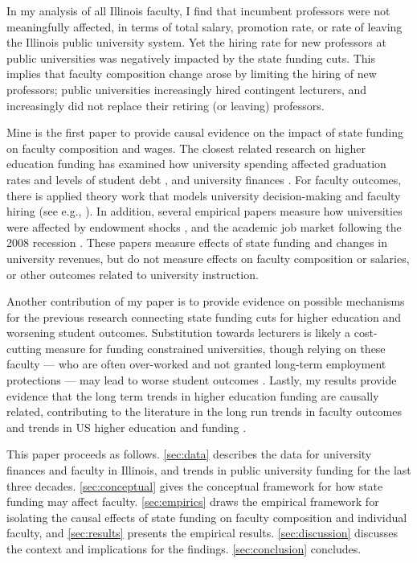 In my analysis of all Illinois faculty, I find that incumbent professors were not meaningfully affected, in terms of total salary, promotion rate, or rate of leaving the Illinois public university system.
Yet the hiring rate for new professors at public universities was negatively impacted by the state funding cuts.
This implies that faculty composition change arose by limiting the hiring of new professors; public universities increasingly hired contingent lecturers, and increasingly did not replace their retiring (or leaving) professors.

Mine is the first paper to provide causal evidence on the impact of state funding on faculty composition and wages.
The closest related research on higher education funding has examined how university spending affected graduation rates and levels of student debt \citep{NBERw23736,NBERw27885}, and university finances \citep{miller2022making,bound2019public,brown2014endowment}.
For faculty outcomes, there is applied theory work that models university decision-making and faculty hiring (see e.g., \citealt{abe2015implications,johnson2009jep,NBERc13879}).
In addition, several empirical papers measure how universities were affected by endowment shocks \citep{brown2014endowment}, and the academic job market following the 2008 recession \citep{turner2014impact}.
These papers measure effects of state funding and changes in university revenues, but do not measure effects on faculty composition or salaries, or other outcomes related to university instruction.

Another contribution of my paper is to provide evidence on possible  mechanisms for the previous research connecting state funding cuts for higher education and worsening student outcomes.
Substitution towards lecturers is likely a cost-cutting measure for funding constrained universities, though relying on these faculty --- who are often over-worked and not granted long-term employment protections --- may lead to worse student outcomes \citep{ehrenberg2005tenured,zhu2021limited,jaeger2011examining}.
Lastly, my results provide evidence that the long term trends in higher education funding are causally related, contributing to the literature in the long run trends in faculty outcomes \citep{ehrenberg2003studying} and trends in US higher education and funding \citep{hoxby2009changing}.

This paper proceeds as follows.
\autoref{sec:data} describes the data for university finances and faculty in Illinois, and trends in public university funding for the last three decades.
\autoref{sec:conceptual} gives the conceptual framework for how state funding may affect faculty.
\autoref{sec:empirics} draws the empirical framework for isolating the causal effects of state funding on faculty composition and individual faculty, and \autoref{sec:results} presents the empirical results.
\autoref{sec:discussion} discusses the context and implications for the findings.
\autoref{sec:conclusion} concludes.
